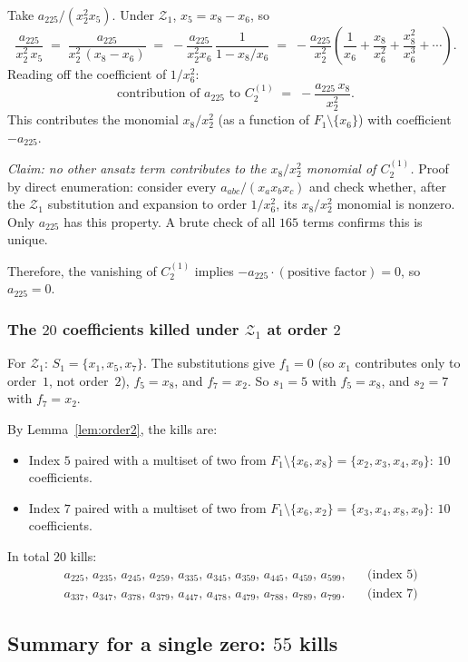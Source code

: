 \documentclass[11pt]{article}
\newcommand{\Z}{\mathcal{Z}}
\theoremstyle{definition}
\begin{document}
Take $a_{225}/(x_2^2 x_5)$. Under $\Z_1$, $x_5=x_8-x_6$, so
\[
\frac{a_{225}}{x_2^2\,x_5} \;=\; \frac{a_{225}}{x_2^2\,(x_8-x_6)}
\;=\; -\frac{a_{225}}{x_2^2 x_6}\,\frac{1}{1-x_8/x_6}
\;=\; -\frac{a_{225}}{x_2^2}\!\left(\frac{1}{x_6}+\frac{x_8}{x_6^2}+\frac{x_8^2}{x_6^3}+\cdots\right).
\]
Reading off the coefficient of $1/x_6^2$:
\[
\text{contribution of $a_{225}$ to $C_2^{(1)}$} \;=\; -\frac{a_{225}\,x_8}{x_2^2}.
\]
This contributes the monomial $x_8/x_2^2$ (as a function of $F_1\setminus\{x_6\}$)
with coefficient $-a_{225}$.

\emph{Claim: no other ansatz term contributes to the $x_8/x_2^2$ monomial of
$C_2^{(1)}$.} Proof by direct enumeration: consider every $a_{abc}/(x_a x_b x_c)$
and check whether, after the $\Z_1$ substitution and expansion to order
$1/x_6^2$, its $x_8/x_2^2$ monomial is nonzero. Only $a_{225}$ has this
property. A brute check of all $165$ terms confirms this is unique.

Therefore, the vanishing of $C_2^{(1)}$ implies $-a_{225}\cdot(\text{positive factor})=0$,
so $a_{225}=0$.

\subsubsection*{The $20$ coefficients killed under $\Z_1$ at order $2$}

For $\Z_1$: $S_1=\{x_1,x_5,x_7\}$. The substitutions give $f_1=0$ (so $x_1$
contributes only to order~$1$, not order~$2$), $f_5=x_8$, and $f_7=x_2$.
So $s_1=5$ with $f_5=x_8$, and $s_2=7$ with $f_7=x_2$.

By Lemma~\ref{lem:order2}, the kills are:
\begin{itemize}[nosep,leftmargin=*]
\item Index $5$ paired with a multiset of two from $F_1\setminus\{x_6,x_8\}=\{x_2,x_3,x_4,x_9\}$:
$10$ coefficients.
\item Index $7$ paired with a multiset of two from $F_1\setminus\{x_6,x_2\}=\{x_3,x_4,x_8,x_9\}$:
$10$ coefficients.
\end{itemize}
In total $20$ kills:
\[
\begin{aligned}
&a_{225},\,a_{235},\,a_{245},\,a_{259},\,a_{335},\,a_{345},\,a_{359},\,a_{445},\,a_{459},\,a_{599},
  &&\text{(index 5)}\\
&a_{337},\,a_{347},\,a_{378},\,a_{379},\,a_{447},\,a_{478},\,a_{479},\,a_{788},\,a_{789},\,a_{799}.
  &&\text{(index 7)}
\end{aligned}
\]

\subsection{Summary for a single zero: $55$ kills}
\end{document}
